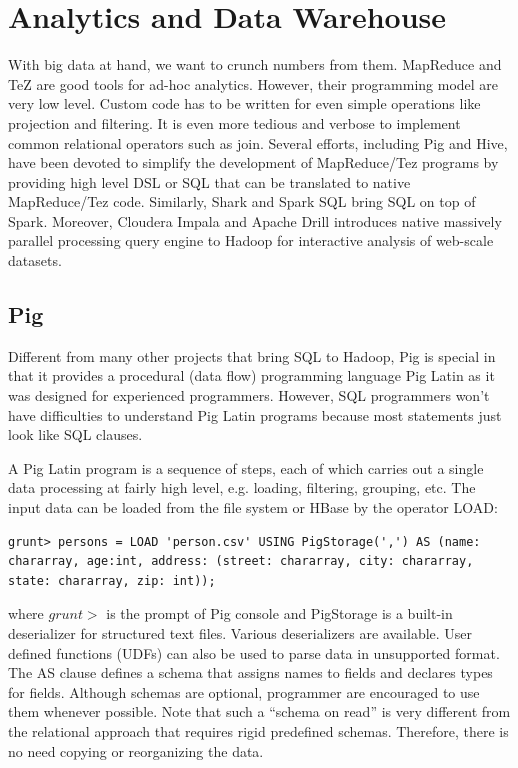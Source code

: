 \documentclass[11pt]{book}
\begin{document}
\chapter{Analytics and Data Warehouse}
With big data at hand, we want to crunch numbers from them. MapReduce and TeZ are good tools for ad-hoc analytics. However, their programming model are very low level. Custom code has to be written for even simple operations like projection and filtering. It is even more tedious and verbose to implement common relational operators such as join. Several efforts, including Pig and Hive, have been devoted to simplify the development of MapReduce/Tez programs by providing high level DSL or SQL that can be translated to native MapReduce/Tez code. Similarly, Shark and Spark SQL bring SQL on top of Spark. Moreover, Cloudera Impala and Apache Drill introduces native massively parallel processing query engine to Hadoop for interactive analysis of web-scale datasets. 

\section{Pig}
Different from many other projects that bring SQL to Hadoop, Pig is special in that it provides a procedural (data flow) programming language Pig Latin as it was designed for experienced programmers. However, SQL programmers won't have difficulties to understand Pig Latin programs because most statements just look like SQL clauses.

A Pig Latin program is a sequence of steps, each of which carries out a single data processing at fairly high level, e.g. loading, filtering, grouping, etc. The input data can be loaded from the file system or HBase by the operator LOAD:

\begin{lstlisting}
grunt> persons = LOAD 'person.csv' USING PigStorage(',') AS (name: chararray, age:int, address: (street: chararray, city: chararray, state: chararray, zip: int));
\end{lstlisting}
where $grunt>$ is the prompt of Pig console and PigStorage is a built-in deserializer for structured text files. Various deserializers are available. User defined functions (UDFs) can also be used to parse data in unsupported format. The AS clause defines a schema that assigns names to fields and declares types for fields. Although schemas are optional, programmer are encouraged to use them whenever possible. Note that such a ``schema on read'' is very different from the relational approach that requires rigid predefined schemas. Therefore, there is no need copying or reorganizing the data.
\end{document}
